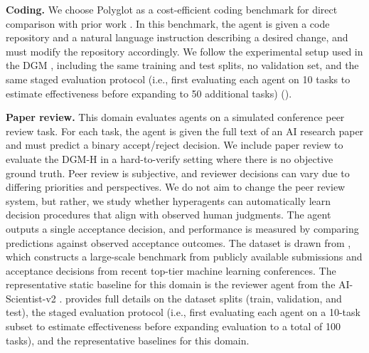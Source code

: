 \documentclass[]{fairmeta}
\begin{document}
\textbf{Coding.}
We choose Polyglot \citep{gauthier2024polyglot} as a cost-efficient coding benchmark for direct comparison with prior work \citep{zhang2025darwin}. In this benchmark, the agent is given a code repository and a natural language instruction describing a desired change, and must modify the repository accordingly. We follow the experimental setup used in the DGM \citep{zhang2025darwin}, including the same training and test splits, no validation set, and the same staged evaluation protocol (i.e., first evaluating each agent on 10 tasks to estimate effectiveness before expanding to 50 additional tasks) ().

\textbf{Paper review.}
This domain evaluates agents on a simulated conference peer review task. For each task, the agent is given the full text of an AI research paper and must predict a binary accept/reject decision. We include paper review to evaluate the DGM-H in a hard-to-verify setting where there is no objective ground truth. Peer review is subjective, and reviewer decisions can vary due to differing priorities and perspectives. We do not aim to change the peer review system, but rather, we study whether hyperagents can automatically learn decision procedures that align with observed human judgments. The agent outputs a single acceptance decision, and performance is measured by comparing predictions against observed acceptance outcomes. The dataset is drawn from \citet{zhao2026apres}, which constructs a large-scale benchmark from publicly available submissions and acceptance decisions from recent top-tier machine learning conferences. The representative static baseline for this domain is the reviewer agent from the AI-Scientist-v2 \citep{yamada2025ai}.  provides full details on the dataset splits (train, validation, and test), the staged evaluation protocol (i.e., first evaluating each agent on a 10-task subset to estimate effectiveness before expanding evaluation to a total of 100 tasks), and the representative baselines for this domain.
\end{document}
